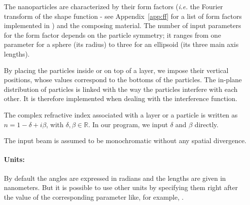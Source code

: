
The nanoparticles are characterized by their form factors
(\textit{i.e.} the Fourier transform of the shape function - see Appendix~\ref{app:ff} for a list of form factors implemented in \BornAgain) and the composing material. The number of input parameters for the form factor depends on the particle symmetry; it ranges from one parameter for a sphere (its radius) to three for an ellipsoid (its three main axis lengths).
  
By placing the particles
inside or on top of a layer, we impose their vertical positions, whose
values correspond to the bottoms of the particles. The in-plane distribution of particles is linked with the way the
particles interfere with each other. It is therefore implemented
when dealing with the interference function.


The complex refractive index associated with a layer or a particle
is written as $n=1-\delta +i\beta$,
with $\delta, \beta \in \mathbb{R}$.
In our program, we input $\delta$ and $\beta$ directly.


\noindent The input beam is assumed to be monochromatic without any
spatial divergence.\\ %

\paragraph{Units:} 

By default the angles are expressed in radians and the lengths are given in
nanometers.  But it is possible to use other units by
specifying them right after the value of the corresponding
parameter like, for example, .


 

